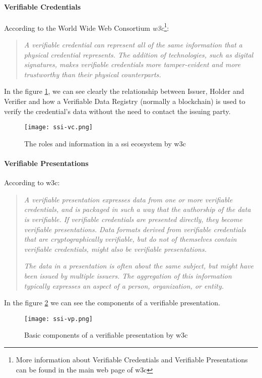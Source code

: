 \paragraph{Verifiable Credentials}
According to the World Wide Web Consortium \textit{\acrshort{w3c}}\cite{w3c-vc}\footnote{\label{footnote-w3c}More information about Verifiable Credentials and Verifiable Presentations can be found in the main web page of \acrshort{w3c}\cite{w3c-vc}}:
\begin{quote}
    \textit{A verifiable credential can represent all of the same information that a physical credential represents. The addition of technologies, such as digital signatures, makes verifiable credentials more tamper-evident and more trustworthy than their physical counterparts.}
\end{quote}
In the figure \ref{fig:ssi-vc}, we can see clearly the relationship between Issuer, Holder and Verifier and how a Verifiable Data Registry (normally a blockchain) is used to verify the credential's data without the need to contact the issuing party.
\begin{figure}[h]
    \centering
    \texttt{[image: ssi-vc.png]}
    \caption{The roles and information in a \acrshort{ssi} ecosystem by \acrshort{w3c}}
    \label{fig:ssi-vc}
\end{figure}

\paragraph{Verifiable Presentations}
According to \acrshort{w3c}\cite{w3c-vc}:
\begin{quote}
    \textit{A verifiable presentation expresses data from one or more verifiable credentials, and is packaged in such a way that the authorship of the data is verifiable. If verifiable credentials are presented directly, they become verifiable presentations. Data formats derived from verifiable credentials that are cryptographically verifiable, but do not of themselves contain verifiable credentials, might also be verifiable presentations.}

    \textit{The data in a presentation is often about the same subject, but might have been issued by multiple issuers. The aggregation of this information typically expresses an aspect of a person, organization, or entity.}
\end{quote}
In the figure \ref{fig:ssi-vp} we can see the components of a verifiable presentation.
\begin{figure}[ht]
    \centering
    \texttt{[image: ssi-vp.png]}
    \caption{Basic components of a verifiable presentation by \acrshort{w3c}}
    \label{fig:ssi-vp}
\end{figure}
